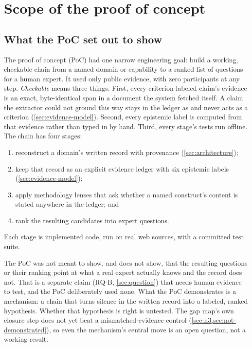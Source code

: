 \section{Scope of the proof of concept}
\label{sec:scope}

\subsection{What the PoC set out to show}

The proof of concept (PoC) had one narrow engineering goal: build a working, checkable chain
from a named domain or capability to a ranked list of questions for a human expert. It used only
public evidence, with zero participants at any step. \evobs{} \emph{Checkable} means three things.
First, every criterion-labeled claim's evidence is an exact, byte-identical span in a document the
system fetched itself. A claim the extractor could not ground this way stays in the ledger as
 and never acts as a criterion (\cref{sec:evidence-model}). Second,
every epistemic label is computed from that evidence rather than typed in by hand. Third, every
stage's tests run offline. The chain has four stages:
\begin{enumerate}[noitemsep]
  \item reconstruct a domain's written record with provenance (\cref{sec:architecture});
  \item keep that record as an explicit evidence ledger with six epistemic labels
    (\cref{sec:evidence-model});
  \item apply methodology lenses that ask whether a named construct's content is stated anywhere
    in the ledger; and
  \item rank the resulting candidates into expert questions.
\end{enumerate}
Each stage is implemented code, run on real web sources, with a committed test suite.

The PoC was not meant to show, and does not show, that the resulting questions or their ranking
point at what a real expert actually knows and the record does not. That is a separate claim
(RQ-B, \cref{sec:question}) that needs human evidence to test, and the PoC deliberately used none.
\evint{} What the PoC demonstrates is a mechanism: a chain that turns silence in the written
record into a labeled, ranked hypothesis. Whether that hypothesis is right is untested. The gap
map's own closure step does not yet beat a mismatched-evidence control (\cref{sec:n3,sec:not-demonstrated}), so
even the mechanism's central move is an open question, not a working result.

